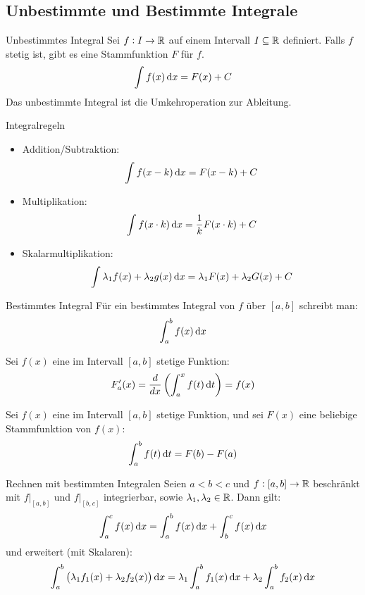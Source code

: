 \subsection{Unbestimmte und Bestimmte Integrale}

\begin{definition}{Unbestimmtes Integral}
    Sei $f: I \to \mathbb{R}$ auf einem Intervall $I \subseteq \mathbb{R}$ definiert.
    Falls $f$ stetig ist, gibt es eine Stammfunktion $F$ für $f$.
    \begin{equation}
        \int f(x) \dif x = F(x) + C
    \end{equation}
    Das unbestimmte Integral ist die Umkehroperation zur Ableitung.
\end{definition}

\begin{concept}{Integralregeln}
    \begin{itemize}
      \item Addition/Subtraktion:
      $$\int f(x-k) \dif x=F(x-k)+C$$
      \item Multiplikation:
      $$\int f(x \cdot k) \dif x=\frac{1}{k} F(x \cdot k)+C$$
      \item Skalarmultiplikation:
      $$\int \lambda_{1} f(x)+\lambda_{2} g(x) \dif x=\lambda_{1} F(x)+\lambda_{2} G(x)+C$$
    \end{itemize}
\end{concept}

\begin{definition}{Bestimmtes Integral}
    Für ein bestimmtes Integral von $f$ über $[a, b]$ schreibt man:
    \begin{equation}
        \int_{a}^{b} f(x) \dif x
    \end{equation}

    Sei $f(x)$ eine im Intervall $[a, b]$ stetige Funktion:
    \begin{equation}
        F'_{a}(x)=\frac{d}{dx}\left(\int_{a}^{x} f(t) \dif t\right)=f(x)
    \end{equation}

    Sei $f(x)$ eine im Intervall $[a, b]$ stetige Funktion, und sei $F(x)$ eine beliebige Stammfunktion von $f(x)$:
    \begin{equation}
        \int_{a}^{b} f(t) \dif t=F(b)-F(a)
    \end{equation}
\end{definition}

\begin{concept}{Rechnen mit bestimmten Integralen}
    Seien $a < b < c$ und $f: [a,b] \to \mathbb{R}$ beschränkt mit $f|_{[a,b]}$ und $f|_{[b,c]}$ integrierbar, sowie $\lambda_1, \lambda_2 \in \mathbb{R}$. Dann gilt:
    \begin{equation}
        \int_a^c f(x) \dif x = \int_a^b f(x) \dif x + \int_b^c f(x) \dif x
    \end{equation}
    und erweitert (mit Skalaren):
    \begin{equation}
        \int_a^b \left( \lambda_1 f_1 (x) + \lambda_2 f_2 (x) \right) \dif x = \lambda_1 \int_a^b f_1(x) \dif x + \lambda_2 \int_a^b f_2(x) \dif x
    \end{equation}
\end{concept}

